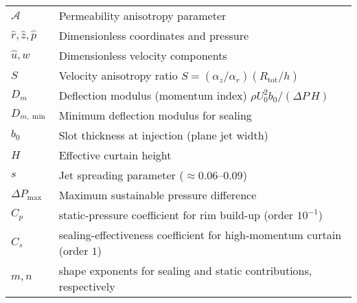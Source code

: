\documentclass[11pt,a4paper]{article}
\begin{document}
\begin{tabular}{@{}ll@{}}
$\mathcal{A}$ & Permeability anisotropy parameter \\
$\hat r,\hat z,\hat p$ & Dimensionless coordinates and pressure \\
$\hat u,\hat w$ & Dimensionless velocity components \\
$S$ & Velocity anisotropy ratio $S=(\alpha_z/\alpha_r)(R_{\mathrm{tot}}/h)$ \\ $D_m$ & Deflection modulus (momentum index) $\rho U_0^2 b_0/(\Delta P\,H)$ \\
$D_{m,\min}$ & Minimum deflection modulus for sealing \\
$b_0$ & Slot thickness at injection (plane jet width) \\
$H$ & Effective curtain height \\
$s$ & Jet spreading parameter ($\approx0.06$--$0.09$) \\
$\Delta P_{\max}$ & Maximum sustainable pressure difference \\
\bottomrule
$C_p$ & static-pressure coefficient for rim build-up (order $10^{-1}$)\\
$C_s$ & sealing-effectiveness coefficient for high-momentum curtain (order $1$)\\
$m,n$ & shape exponents for sealing and static contributions, respectively\\
\end{tabular}
\end{document}
